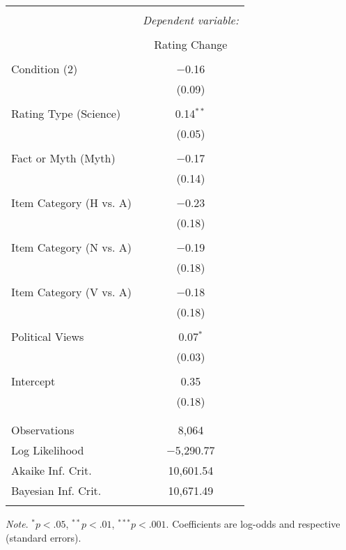 \documentclass[12pt]{article}  %
\begin{document}
\begin{table}[!htbp] \centering 
\begin{tabular}{@{\extracolsep{5pt}}lc} 
\\[-1.8ex]\hline 
\hline \\[-1.8ex] 
 & \multicolumn{1}{c}{\textit{Dependent variable:}} \\ 
\cline{2-2} 
\\[-1.8ex] & Rating Change \\ 
\hline \\[-1.8ex] 
 Condition (2) & $-$0.16 \\ 
  & (0.09) \\ 
  & \\ 
 Rating Type (Science) & 0.14$^{**}$ \\ 
  & (0.05) \\ 
  & \\ 
 Fact or Myth (Myth) & $-$0.17 \\ 
  & (0.14) \\ 
  & \\ 
 Item Category (H vs. A) & $-$0.23 \\ 
  & (0.18) \\ 
  & \\ 
 Item Category (N vs. A) & $-$0.19 \\ 
  & (0.18) \\ 
  & \\ 
 Item Category (V vs. A) & $-$0.18 \\ 
  & (0.18) \\ 
  & \\ 
 Political Views & 0.07$^{*}$ \\ 
  & (0.03) \\ 
  & \\ 
 Intercept & 0.35 \\ 
  & (0.18) \\ 
  & \\ 
\hline \\[-1.8ex] 
Observations & 8,064 \\ 
Log Likelihood & $-$5,290.77 \\ 
Akaike Inf. Crit. & 10,601.54 \\ 
Bayesian Inf. Crit. & 10,671.49 \\ 
\hline 
\hline \\[-1.8ex]
\end{tabular} 
\end{table} 

\singlespacing
\textit{Note}. $^{*}p < .05$, $^{**}p < .01$, $^{***}p < .001$. Coefficients are log-odds and respective (standard errors). 
\end{document}
